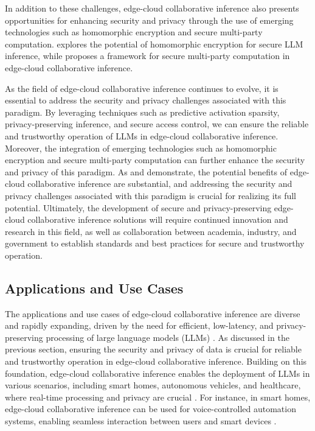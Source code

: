 \documentclass[11pt,a4paper]{article}
\begin{document}
In addition to these challenges, edge-cloud collaborative inference also presents opportunities for enhancing security and privacy through the use of emerging technologies such as homomorphic encryption and secure multi-party computation. \cite{doi:10.1145/3676641.3715983} explores the potential of homomorphic encryption for secure LLM inference, while \cite{arxiv:2409.14961} proposes a framework for secure multi-party computation in edge-cloud collaborative inference.

As the field of edge-cloud collaborative inference continues to evolve, it is essential to address the security and privacy challenges associated with this paradigm. By leveraging techniques such as predictive activation sparsity, privacy-preserving inference, and secure access control, we can ensure the reliable and trustworthy operation of LLMs in edge-cloud collaborative inference. Moreover, the integration of emerging technologies such as homomorphic encryption and secure multi-party computation can further enhance the security and privacy of this paradigm. As \cite{arxiv:2410.00531} and \cite{arxiv:2405.14371} demonstrate, the potential benefits of edge-cloud collaborative inference are substantial, and addressing the security and privacy challenges associated with this paradigm is crucial for realizing its full potential. Ultimately, the development of secure and privacy-preserving edge-cloud collaborative inference solutions will require continued innovation and research in this field, as well as collaboration between academia, industry, and government to establish standards and best practices for secure and trustworthy operation.


\subsection{Applications and Use Cases}


The applications and use cases of edge-cloud collaborative inference are diverse and rapidly expanding, driven by the need for efficient, low-latency, and privacy-preserving processing of large language models (LLMs) \cite{arxiv:2309.04255}. As discussed in the previous section, ensuring the security and privacy of data is crucial for reliable and trustworthy operation in edge-cloud collaborative inference. Building on this foundation, edge-cloud collaborative inference enables the deployment of LLMs in various scenarios, including smart homes, autonomous vehicles, and healthcare, where real-time processing and privacy are crucial \cite{doi:10.1109/comst.2025.3527641}. For instance, in smart homes, edge-cloud collaborative inference can be used for voice-controlled automation systems, enabling seamless interaction between users and smart devices \cite{doi:10.1145/3466752.3480095}.
\end{document}
